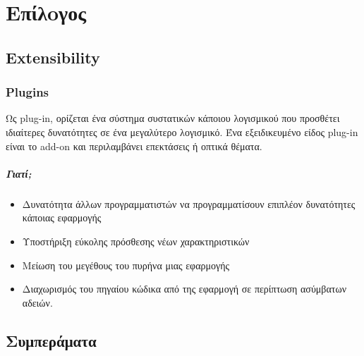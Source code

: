\chapter{Επίλoγος}

\section{Extensibility}	
	\subsection{Plugins}
	Ως plug-in, ορίζεται ένα σύστημα συστατικών κάποιου λογισμικού που προσθέτει ιδιαίτερες δυνατότητες σε ένα μεγαλύτερο λογισμικό. Ένα εξειδικευμένο είδος plug-in είναι το add-on και περιλαμβάνει επεκτάσεις ή οπτικά θέματα.	
	\paragraph{Γιατί;}
	\begin{itemize}
		\item Δυνατότητα άλλων προγραμματιστών να προγραμματίσουν επιπλέον δυνατότητες κάποιας εφαρμογής
		\item Υποστήριξη εύκολης πρόσθεσης νέων χαρακτηριστικών
		\item Μείωση του μεγέθους του πυρήνα μιας εφαρμογής
		\item Διαχωρισμός του πηγαίου κώδικα από της εφαρμογή σε περίπτωση ασύμβατων αδειών.
	\end{itemize}
\section{Συμπεράματα}
